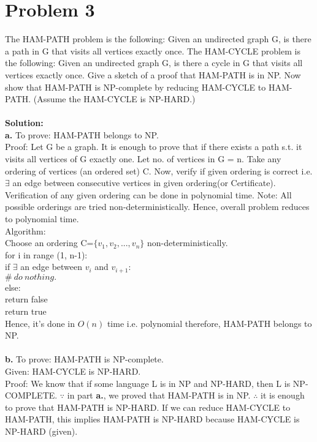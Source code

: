 \documentclass{article}
\newcommand\tab[1][4mm]{\hspace*{#1}}
\begin{document}
\section*{Problem 3}
The HAM-PATH problem is the following: Given an undirected graph G, is there a path in G that visits all vertices exactly once. The HAM-CYCLE problem is the following: Given an undirected graph G, is there a cycle in G that visits all vertices exactly once. Give a sketch of a proof that HAM-PATH is in NP. Now show that HAM-PATH is NP-complete by reducing HAM-CYCLE to HAM-PATH. (Assume the HAM-CYCLE is NP-HARD.) \\
\vspace{1mm} \\
\textbf{Solution:} \\
\textbf{a.} To prove: HAM-PATH belongs to NP. \\
Proof: Let G be a graph. It is enough to prove that if there exists a path s.t. it visits all vertices of G exactly one. Let no. of vertices in G = n. Take any ordering of vertices (an ordered set) C. Now, verify if given ordering is correct i.e. $\exists$ an edge between consecutive vertices in given ordering(or Certificate). Verification of any given ordering can be done in polynomial time. Note: All possible orderings are tried non-deterministically. Hence, overall problem reduces to polynomial time. \\
Algorithm: \\
Choose an ordering C=$\{v_1, v_2, ... ,v_n\}$ non-deterministically. \\
for i in range (1, n-1): \\
\tab if $\exists$ an edge between $v_i$ and $v_{i+1}$: \\
\tab\tab $\#\ do\ nothing.$ \\
\tab else: \\
\tab\tab return false \\
return true \\
Hence, it's done in $O(n)$ time i.e. polynomial therefore, HAM-PATH belongs to NP. \\
\vspace{1mm} \\
\textbf{b.} To prove: HAM-PATH is NP-complete. \\
Given: HAM-CYCLE is NP-HARD. \\
Proof: We know that if some language L is in NP and NP-HARD, then L is NP-COMPLETE. $\because$ in part \textbf{a.}, we proved that HAM-PATH is in NP. $\therefore$ it is enough to prove that HAM-PATH is NP-HARD. If we can reduce HAM-CYCLE to HAM-PATH, this implies HAM-PATH is NP-HARD because HAM-CYCLE is NP-HARD (given). \\
\end{document}
